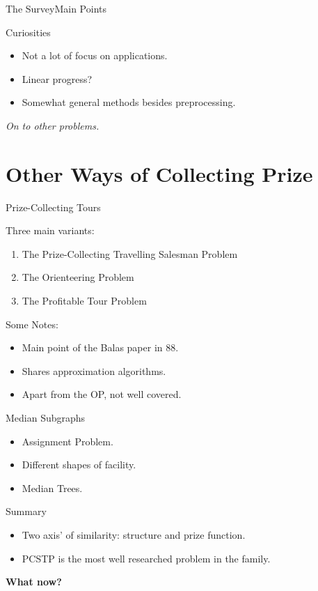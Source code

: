 \documentclass[rgb,dvipsnames]{beamer}
\begin{document}
\begin{frame}{The Survey}{Main Points}
  \begin{block}{Curiosities}
  \begin{itemize}
  \item Not a lot of focus on applications.
  \item Linear progress?
  \item Somewhat general methods besides preprocessing.
  \end{itemize}
\end{block}
\pause
\textit{On to other problems.}
\end{frame}

\section{Other Ways of Collecting Prize}
\begin{frame}{Prize-Collecting Tours}
  \begin{block}{Three main variants:}
    \begin{enumerate}
    \item The Prize-Collecting Travelling Salesman Problem
    \item The Orienteering Problem
    \item The Profitable Tour Problem
    \end{enumerate}
  \end{block}
  \pause
  \begin{block}{Some Notes:}
  \begin{itemize}
  \item Main point of the Balas paper in 88.
  \item Shares approximation algorithms.
  \item Apart from the OP, not well covered.
  \end{itemize}
\end{block}

\end{frame}

\begin{frame}{Median Subgraphs}
  \begin{itemize}
  \item Assignment Problem.
  \item Different shapes of facility.
  \item Median Trees.
  \end{itemize}
\end{frame}

\begin{frame}{Summary}
  \begin{itemize}
  \item Two axis' of similarity: structure and prize function.
  \item PCSTP is the most well researched problem in the family.
  \end{itemize}
  \pause
  \textbf{What now?}
\end{frame}
\end{document}
